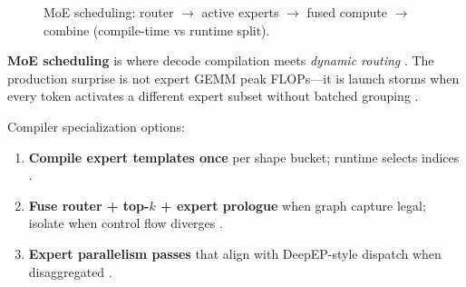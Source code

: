 \begin{figure}[t]
\centering
{}
\caption{MoE scheduling: router $\rightarrow$ active experts $\rightarrow$ fused compute $\rightarrow$ combine (compile-time vs runtime split).}
\label{fig:moe_scheduling_architecture}
\end{figure}

\textbf{MoE scheduling} is where decode compilation meets \emph{dynamic routing} \citep{liu2024deepseekv3,taxbreak2026,patel2025llminference,kwon2023vllm,yirage2026,chen2020compilerbasedhardw}. The production surprise is not expert GEMM peak FLOPs---it is launch storms when every token activates a different expert subset without batched grouping \citep{taxbreak2026,liu2024deepseekv3,memoryfloor2026,patel2025llminference,yirage2026,chen2020compilerbasedhardw,kwon2023vllm,amd2024aie,dlbook,semianalysis2024tma,amd2024xdna,dao2022flashattention,dao2023flashdecoding,nvidia2024cudagraphs,nvidia2022hopper}.

Compiler specialization options:
\begin{enumerate}
\item \textbf{Compile expert templates once} per shape bucket; runtime selects indices \citep{liu2024deepseekv3,chen2020compilerbasedhardw,yirage2026,patel2025llminference,kwon2023vllm,taxbreak2026,memoryfloor2026,amd2024aie,dlbook,semianalysis2024tma,amd2024xdna,dao2022flashattention,dao2023flashdecoding,nvidia2024cudagraphs,nvidia2022hopper}.
\item \textbf{Fuse router + top-$k$ + expert prologue} when graph capture legal; isolate when control flow diverges \citep{nvidia2024cudagraphs,kwon2023vllm,liu2024deepseekv3,yirage2026,chen2020compilerbasedhardw,patel2025llminference,taxbreak2026,memoryfloor2026,amd2024aie,dlbook,semianalysis2024tma,amd2024xdna,dao2022flashattention,dao2023flashdecoding,nvidia2024cudagraphs,nvidia2022hopper}.
\item \textbf{Expert parallelism passes} that align with DeepEP-style dispatch when disaggregated \citep{liu2024deepseekv3,patel2025llminference,yirage2026,chen2020compilerbasedhardw,kwon2023vllm,taxbreak2026,memoryfloor2026,amd2024aie,dlbook,semianalysis2024tma,amd2024xdna,dao2022flashattention,dao2023flashdecoding,nvidia2024cudagraphs,nvidia2022hopper}.
\end{enumerate}

